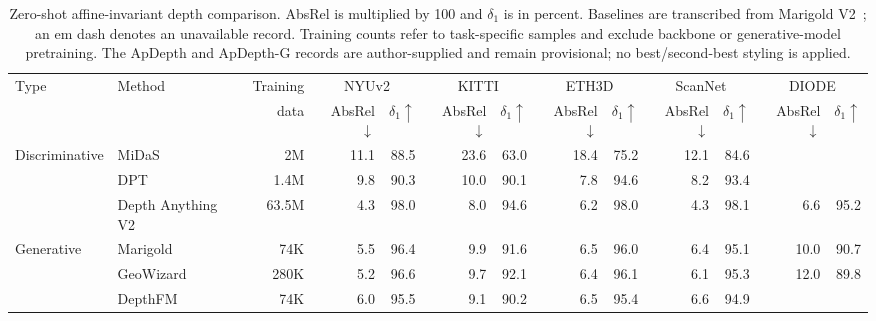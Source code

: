 \begin{table}[!t]
	\centering
	\caption{Zero-shot affine-invariant depth comparison. AbsRel is multiplied by 100 and $\delta_1$ is in percent. Baselines are transcribed from Marigold V2~\cite{pavlovic2026marigoldv2}; an em dash denotes an unavailable record. Training counts refer to task-specific samples and exclude backbone or generative-model pretraining. The ApDepth and ApDepth-G records are author-supplied and remain provisional; no best/second-best styling is applied.}
	\label{tab:main}
	\setlength{\tabcolsep}{4pt}
	\footnotesize
	\begin{tabular}{@{}llrrrrrrrrrrr@{}}
		\toprule
		Type           & Method                                      & Training & \multicolumn{2}{c}{NYUv2} & \multicolumn{2}{c}{KITTI} & \multicolumn{2}{c}{ETH3D} & \multicolumn{2}{c}{ScanNet} & \multicolumn{2}{c}{DIODE} \\
		\cmidrule(lr){4-5}\cmidrule(lr){6-7}\cmidrule(lr){8-9}\cmidrule(lr){10-11}\cmidrule(l){12-13}
		               &                                             & data     & AbsRel$\downarrow$ & $\delta_1\uparrow$ & AbsRel$\downarrow$ & $\delta_1\uparrow$ & AbsRel$\downarrow$ & $\delta_1\uparrow$ & AbsRel$\downarrow$ & $\delta_1\uparrow$ & AbsRel$\downarrow$ & $\delta_1\uparrow$ \\
		\midrule
		Discriminative & MiDaS~\cite{ranftl2020towards}              & 2M       & 11.1 & 88.5 & 23.6 & 63.0 & 18.4 & 75.2 & 12.1 & 84.6 & \textemdash & \textemdash \\
		               & DPT~\cite{ranftl2021vision}                 & 1.4M     & 9.8 & 90.3 & 10.0 & 90.1 & 7.8 & 94.6 & 8.2 & 93.4 & \textemdash & \textemdash \\
		               & Depth Anything V2~\cite{Li2024DepthV2}      & 63.5M    & 4.3 & 98.0 & 8.0 & 94.6 & 6.2 & 98.0 & 4.3 & 98.1 & 6.6 & 95.2 \\
		\midrule
		Generative     & Marigold~\cite{ke2024repurposing}          & 74K      & 5.5 & 96.4 & 9.9 & 91.6 & 6.5 & 96.0 & 6.4 & 95.1 & 10.0 & 90.7 \\
		               & GeoWizard~\cite{fu2025geowizard}           & 280K     & 5.2 & 96.6 & 9.7 & 92.1 & 6.4 & 96.1 & 6.1 & 95.3 & 12.0 & 89.8 \\
		               & DepthFM~\cite{gui2024depthfm}              & 74K      & 6.0 & 95.5 & 9.1 & 90.2 & 6.5 & 95.4 & 6.6 & 94.9 & \textemdash & \textemdash \\

\end{tabular}
\end{table}
